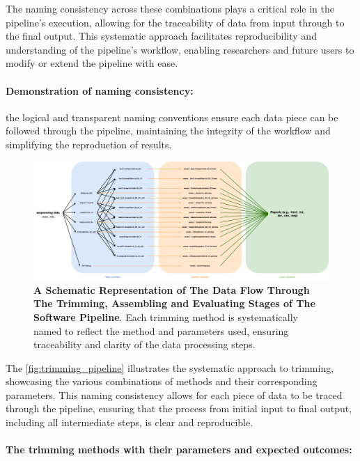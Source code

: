The naming consistency across these combinations plays a critical role in the pipeline's execution, allowing for the traceability of data from input through to the final output. This systematic approach facilitates reproducibility and understanding of the pipeline's workflow, enabling researchers and future users to modify or extend the pipeline with ease.

\paragraph{Demonstration of naming consistency:}
the logical and transparent naming conventions ensure each data piece can be followed through the pipeline, maintaining the integrity of the workflow and simplifying the reproduction of results.

\begin{figure}[ht]
    \centering
    \includegraphics[width=\textwidth]{resources/images/NGS-pipeline.drawio.png}
    \caption{\textbf{A Schematic Representation of The Data Flow Through The Trimming, Assembling and Evaluating Stages of The Software Pipeline}. Each \gls{trimming} method is systematically named to reflect the method and parameters used, ensuring traceability and clarity of the data processing steps.}
    \label{fig:trimming_pipeline}
\end{figure}

The \autoref{fig:trimming_pipeline} illustrates the systematic approach to \gls{trimming}, showcasing the various combinations of methods and their corresponding parameters. This naming consistency allows for each piece of data to be traced through the pipeline, ensuring that the process from initial input to final output, including all intermediate steps, is clear and reproducible.

\paragraph{The \gls{trimming} methods with their parameters and expected outcomes:}

